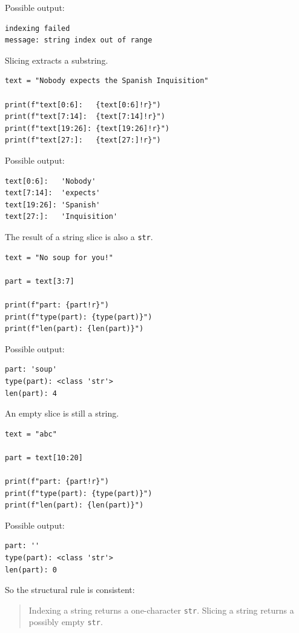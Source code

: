 Possible output:

\begin{verbatim}
indexing failed
message: string index out of range
\end{verbatim}

Slicing extracts a substring.

\begin{verbatim}
text = "Nobody expects the Spanish Inquisition"

print(f"text[0:6]:   {text[0:6]!r}")
print(f"text[7:14]:  {text[7:14]!r}")
print(f"text[19:26]: {text[19:26]!r}")
print(f"text[27:]:   {text[27:]!r}")
\end{verbatim}

Possible output:

\begin{verbatim}
text[0:6]:   'Nobody'
text[7:14]:  'expects'
text[19:26]: 'Spanish'
text[27:]:   'Inquisition'
\end{verbatim}

The result of a string slice is also a \texttt{str}.

\begin{verbatim}
text = "No soup for you!"

part = text[3:7]

print(f"part: {part!r}")
print(f"type(part): {type(part)}")
print(f"len(part): {len(part)}")
\end{verbatim}

Possible output:

\begin{verbatim}
part: 'soup'
type(part): <class 'str'>
len(part): 4
\end{verbatim}

An empty slice is still a string.

\begin{verbatim}
text = "abc"

part = text[10:20]

print(f"part: {part!r}")
print(f"type(part): {type(part)}")
print(f"len(part): {len(part)}")
\end{verbatim}

Possible output:

\begin{verbatim}
part: ''
type(part): <class 'str'>
len(part): 0
\end{verbatim}

So the structural rule is consistent:

\begin{quote}
Indexing a string returns a one-character \texttt{str}. Slicing a string returns a possibly empty \texttt{str}.
\end{quote}

